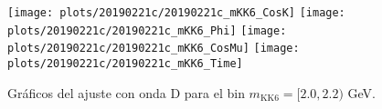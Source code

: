 \begin{figure}[H]
\centering
\begin{multicols}{2}
\texttt{[image: plots/20190221c/20190221c\_mKK6\_CosK]}
\texttt{[image: plots/20190221c/20190221c\_mKK6\_Phi]}
\texttt{[image: plots/20190221c/20190221c\_mKK6\_CosMu]}
\texttt{[image: plots/20190221c/20190221c\_mKK6\_Time]}
\end{multicols}
\vspace*{-0.5cm}
\caption{Gráficos del ajuste con onda D para el bin $m_{\text{KK}6} = [2.0,2.2)$ GeV.}  \label{fig:20190221c_mKK6}
\end{figure}





